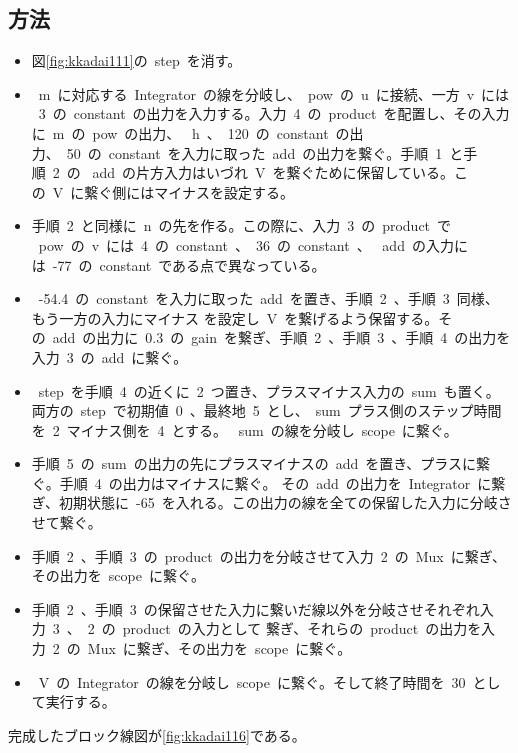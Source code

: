 \documentclass[10pt]{jarticle}
\begin{document}
\subsection{方法}
%
\begin{itemize}
	\setlength{\leftskip}{1.5cm}
	\item[手順1 ] 図\ref{fig:kkadai111}の\ step\ を消す。
	\item[手順2 ] \ m\ に対応する\ Integrator\ の線を分岐し、\ pow\ の\ u\ に接続、一方\ v\ には
		\ 3\ の\ constant\ の出力を入力する。入力\ 4\ の\ product\ を配置し、その入力に\ m\ の\ pow\ の出力、
		\ h\ 、\ 120\ の\ constant\ の出力、\ 50\ の\ constant\ を入力に取った\ add\ の出力を繋ぐ。手順\ 1\ と手順\ 2\ の
		\ add\ の片方入力はいづれ\ V\ を繋ぐために保留している。この\ V\ に繋ぐ側にはマイナスを設定する。
	\item[手順3 ] 手順\ 2\ と同様に\ n\ の先を作る。この際に、入力\ 3\ の\ product\ で
		\ pow\ の\ v\ には\ 4\ の\ constant\ 、\ 36\ の\ constant\ 、
		\ add\ の入力には\ -77\ の\ constant\ である点で異なっている。
	\item[手順4 ] \ -54.4\ の\ constant\ を入力に取った\ add\ を置き、手順\ 2\ 、手順\ 3\ 同様、もう一方の入力にマイナス
		を設定し\ V\ を繋げるよう保留する。その\ add\ の出力に\ 0.3\ の\ gain\ を繋ぎ、手順\ 2\ 、手順\ 3\ 、手順\ 4\ の出力を
		入力\ 3\ の\ add\ に繋ぐ。
	\item[手順5 ] \ step\ を手順\ 4\ の近くに\ 2\ つ置き、プラスマイナス入力の\ sum\ も置く。
		両方の\ step\ で初期値\ 0\ 、最終地\ 5\ とし、\ sum\ プラス側のステップ時間を\ 2\ マイナス側を\ 4\ とする。
		\ sum\ の線を分岐し\ scope\ に繋ぐ。
	\item[手順6 ] 手順\ 5\ の\ sum\ の出力の先にプラスマイナスの\ add\ を置き、プラスに繋ぐ。手順\ 4\ の出力はマイナスに繋ぐ。
		その\ add\ の出力を\ Integrator\ に繋ぎ、初期状態に\ -65\ を入れる。この出力の線を全ての保留した入力に分岐させて繋ぐ。
	\item[手順7 ] 手順\ 2\ 、手順\ 3\	の\ product\ の出力を分岐させて入力\ 2\ の\ Mux\ に繋ぎ、その出力を\ scope\ に繋ぐ。
	\item[手順8 ] 手順\ 2\ 、手順\ 3\	の保留させた入力に繋いだ線以外を分岐させそれぞれ入力\ 3\ 、\ 2\ の\ product\ の入力として
		繋ぎ、それらの\ product\ の出力を入力\ 2\ の\ Mux\ に繋ぎ、その出力を\ scope\ に繋ぐ。
	\item[手順9 ]	\ V\ の\ Integrator\ の線を分岐し\ scope\ に繋ぐ。そして終了時間を\ 30\ として実行する。
\end{itemize}
完成したブロック線図が\ref{fig:kkadai116}である。
%
\end{document}
